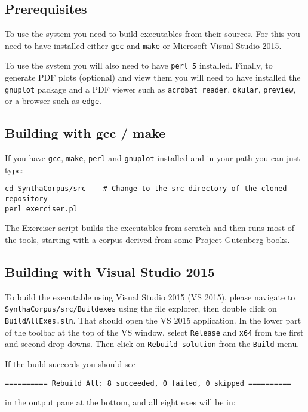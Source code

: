 \documentclass{article}
\begin{document}
\subsection{Prerequisites}

To use the system you need to build executables from their sources.
For this you need to have installed either \texttt{gcc} and
\texttt{make} or Microsoft Visual Studio 2015.

To use the system you will also need to have \texttt{perl 5}
installed.  Finally, to generate PDF plots (optional) and view them you will
need to have installed the \texttt{gnuplot} package and a PDF viewer
such as \texttt{acrobat reader}, \texttt{okular}, \texttt{preview}, or
a browser such as \texttt{edge}.

\subsection{Building with gcc / make}

If you have \texttt{gcc}, \texttt{make}, \texttt{perl} and
\texttt{gnuplot} installed and in your path you can just type:

\begin{verbatim}
cd SynthaCorpus/src    # Change to the src directory of the cloned repository
perl exerciser.pl
\end{verbatim}

The Exerciser script builds the executables from scratch and then runs
most of the tools, starting with a corpus derived from some Project
Gutenberg books.

\subsection{Building with Visual Studio 2015}

To build the executable using Visual Studio 2015 (VS 2015), please navigate to
\texttt{SynthaCorpus/src/Buildexes} using the file explorer, then
double click on \texttt{BuildAllExes.sln}. That should open the VS
2015 application.  In the lower part of the toolbar at the top
of the VS window, select \texttt{Release} and \texttt{x64} from the
first and second drop-downs.  Then click on \texttt{Rebuild solution}
from the \texttt{Build} menu.

If the build succeeds you should see
\begin{verbatim}
========== Rebuild All: 8 succeeded, 0 failed, 0 skipped ==========
\end{verbatim}
in the output pane at the bottom, and all eight exes will be in:
\end{document}
